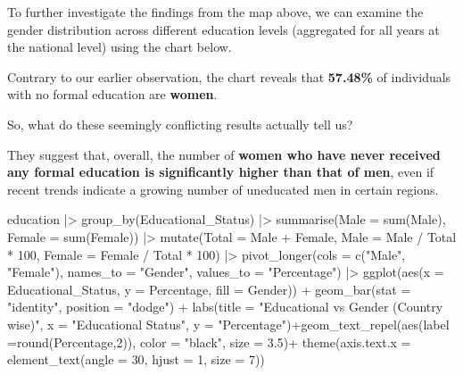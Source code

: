 \documentclass[
  11pt,
  a4paper,
  DIV=11,
  numbers=noendperiod]{scrartcl}
\newenvironment{Shaded}{\begin{snugshade}}{\end{snugshade}}
\newcommand{\AttributeTok}[1]{\textcolor[rgb]{0.40,0.45,0.13}{#1}}
\newcommand{\DecValTok}[1]{\textcolor[rgb]{0.68,0.00,0.00}{#1}}
\newcommand{\FloatTok}[1]{\textcolor[rgb]{0.68,0.00,0.00}{#1}}
\newcommand{\FunctionTok}[1]{\textcolor[rgb]{0.28,0.35,0.67}{#1}}
\newcommand{\NormalTok}[1]{\textcolor[rgb]{0.00,0.23,0.31}{#1}}
\newcommand{\SpecialCharTok}[1]{\textcolor[rgb]{0.37,0.37,0.37}{#1}}
\newcommand{\StringTok}[1]{\textcolor[rgb]{0.13,0.47,0.30}{#1}}
\begin{document}
To further investigate the findings from the map above, we can examine
the gender distribution across different education levels (aggregated
for all years at the national level) using the chart below.

Contrary to our earlier observation, the chart reveals that
{\textbf{57.48\%}} of individuals with no formal education are
{\textbf{women}}.

So, what do these seemingly conflicting results actually tell us?

They suggest that, overall, the number of {\textbf{women who have never
received any formal education is significantly higher than that of
men}}, even if recent trends indicate a growing number of uneducated men
in certain regions.

\begin{Shaded}
\begin{Highlighting}[]
\NormalTok{ education }\SpecialCharTok{|\textgreater{}} \FunctionTok{group\_by}\NormalTok{(Educational\_Status)  }\SpecialCharTok{|\textgreater{}}
  \FunctionTok{summarise}\NormalTok{(}\AttributeTok{Male =} \FunctionTok{sum}\NormalTok{(Male),}
            \AttributeTok{Female =} \FunctionTok{sum}\NormalTok{(Female)) }\SpecialCharTok{|\textgreater{}} \FunctionTok{mutate}\NormalTok{(}\AttributeTok{Total =}\NormalTok{ Male }\SpecialCharTok{+}\NormalTok{ Female,}
         \AttributeTok{Male =}\NormalTok{ Male }\SpecialCharTok{/}\NormalTok{ Total }\SpecialCharTok{*} \DecValTok{100}\NormalTok{,}
         \AttributeTok{Female =}\NormalTok{ Female }\SpecialCharTok{/}\NormalTok{ Total }\SpecialCharTok{*} \DecValTok{100}\NormalTok{) }\SpecialCharTok{|\textgreater{}}
  \FunctionTok{pivot\_longer}\NormalTok{(}\AttributeTok{cols =} \FunctionTok{c}\NormalTok{(}\StringTok{"Male"}\NormalTok{, }\StringTok{"Female"}\NormalTok{), }\AttributeTok{names\_to =} \StringTok{"Gender"}\NormalTok{, }\AttributeTok{values\_to =} \StringTok{"Percentage"}\NormalTok{) }\SpecialCharTok{|\textgreater{}}
  \FunctionTok{ggplot}\NormalTok{(}\FunctionTok{aes}\NormalTok{(}\AttributeTok{x =}\NormalTok{ Educational\_Status, }\AttributeTok{y =}\NormalTok{ Percentage, }\AttributeTok{fill =}\NormalTok{ Gender)) }\SpecialCharTok{+}
  \FunctionTok{geom\_bar}\NormalTok{(}\AttributeTok{stat =} \StringTok{"identity"}\NormalTok{, }\AttributeTok{position =} \StringTok{"dodge"}\NormalTok{) }\SpecialCharTok{+}
  \FunctionTok{labs}\NormalTok{(}\AttributeTok{title =} \StringTok{"Educational vs Gender (Country wise)"}\NormalTok{, }\AttributeTok{x =} \StringTok{"Educational Status"}\NormalTok{, }\AttributeTok{y =} \StringTok{"Percentage"}\NormalTok{)}\SpecialCharTok{+}\FunctionTok{geom\_text\_repel}\NormalTok{(}\FunctionTok{aes}\NormalTok{(}\AttributeTok{label =}\FunctionTok{round}\NormalTok{(Percentage,}\DecValTok{2}\NormalTok{)), }\AttributeTok{color =} \StringTok{"black"}\NormalTok{, }\AttributeTok{size =} \FloatTok{3.5}\NormalTok{)}\SpecialCharTok{+}
  \FunctionTok{theme}\NormalTok{(}\AttributeTok{axis.text.x =} \FunctionTok{element\_text}\NormalTok{(}\AttributeTok{angle =} \DecValTok{30}\NormalTok{, }\AttributeTok{hjust =} \DecValTok{1}\NormalTok{, }\AttributeTok{size =} \DecValTok{7}\NormalTok{))}
\end{Highlighting}
\end{Shaded}
\end{document}
